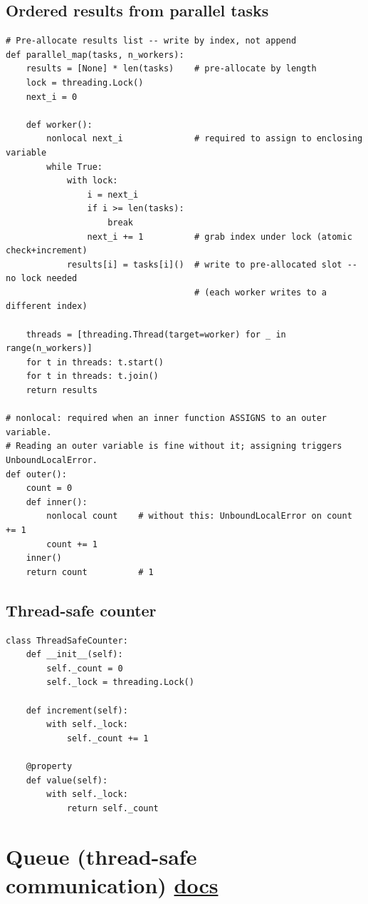 \documentclass[10pt,letterpaper]{article}
\begin{document}
\subsection{Ordered results from parallel tasks}
\begin{lstlisting}
# Pre-allocate results list -- write by index, not append
def parallel_map(tasks, n_workers):
    results = [None] * len(tasks)    # pre-allocate by length
    lock = threading.Lock()
    next_i = 0

    def worker():
        nonlocal next_i              # required to assign to enclosing variable
        while True:
            with lock:
                i = next_i
                if i >= len(tasks):
                    break
                next_i += 1          # grab index under lock (atomic check+increment)
            results[i] = tasks[i]()  # write to pre-allocated slot -- no lock needed
                                     # (each worker writes to a different index)

    threads = [threading.Thread(target=worker) for _ in range(n_workers)]
    for t in threads: t.start()
    for t in threads: t.join()
    return results

# nonlocal: required when an inner function ASSIGNS to an outer variable.
# Reading an outer variable is fine without it; assigning triggers UnboundLocalError.
def outer():
    count = 0
    def inner():
        nonlocal count    # without this: UnboundLocalError on count += 1
        count += 1
    inner()
    return count          # 1
\end{lstlisting}

\subsection{Thread-safe counter}
\begin{lstlisting}
class ThreadSafeCounter:
    def __init__(self):
        self._count = 0
        self._lock = threading.Lock()

    def increment(self):
        with self._lock:
            self._count += 1

    @property
    def value(self):
        with self._lock:
            return self._count
\end{lstlisting}

\section{Queue (thread-safe communication) \normalfont\small\href{https://docs.python.org/3/library/queue.html}{docs}}
\end{document}
